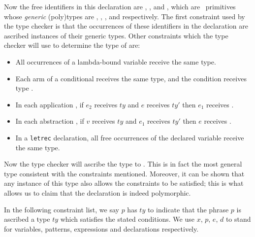 \documentclass[11pt]{article}
\begin{document}
Now the free identifiers in this declaration are , ,
 and
, which are \ML\ primitives whose {\it generic\/} (poly)types are
, , , and
respectively.  The first constraint used by the type checker is that the
occurrences of these identifiers in the declaration are ascribed instances of
their generic types.  Other constraints which the type checker will use to
determine the type of  are:

\begin{itemize}\vspace*{-2mm}\setlength{\itemsep}{0mm}
  \item All occurrences of a lambda-bound variable receive the same type.

  \item Each arm of a conditional receives the same type, and the condition
	receives type .

  \item In each application , if $e_2$ receives $ty$ and
	$e$ receives $ty'$ then $e_1$ receives .

  \item In each abstraction , if $v$ receives
	$ty$ and $e_1$ receives $ty'$ then $e$ receives .

  \item In a {\tt letrec} declaration, all free occurrences of the
	declared variable receive the same type.
\end{itemize}


Now the type checker will ascribe the type
 to
.  This is in fact the most general type consistent with the
constraints mentioned.  Moreover, it can be shown that any instance of this type
also allows the constraints to be satisfied; this is what allows us to claim
that the declaration is indeed polymorphic.

In the following constraint list, we say $p$ has $ty$ to indicate that the
phrase $p$ is ascribed a type $ty$ which satisfies the stated conditions.  We
use $x$, $p$, $e$, $d$ to stand for variables, patterns, expressions and
declarations respectively.
\end{document}
